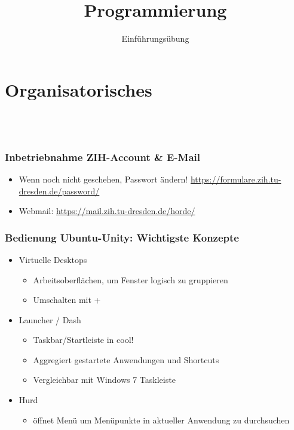 
\title{Programmierung}
\subtitle{Einführungsübung}


    \begin{frame}
        \frontframe
    \end{frame}

    \section{Organisatorisches}\subsection{~}
    \begin{frame}
        \frametitle{Inbetriebnahme ZIH-Account \& E-Mail}
        \begin{itemize}
            \item Wenn noch nicht geschehen, Passwort ändern!
                \url{https://formulare.zih.tu-dresden.de/password/}
            \item Webmail: \url{https://mail.zih.tu-dresden.de/horde/}
        \end{itemize}
    \end{frame}

    \begin{frame}
        \frametitle{Bedienung Ubuntu-Unity: Wichtigste Konzepte}
        \begin{itemize}
            \item Virtuelle Desktops
                \begin{itemize}
                    \item Arbeitsoberflächen, um Fenster logisch zu gruppieren
                    \item Umschalten mit +
                \end{itemize}
            \pause
            \item Launcher / Dash
                \begin{itemize}
                    \item Taskbar/Startleiste in cool!
                    \item Aggregiert gestartete Anwendungen und Shortcuts
                    \item Vergleichbar mit Windows 7 Taskleiste
                \end{itemize}
            \pause
            \item Hurd
                \begin{itemize}
                    \item {} öffnet Menü um Menüpunkte in aktueller
                        Anwendung zu durchsuchen
                \end{itemize}
        \end{itemize}
    \end{frame}

